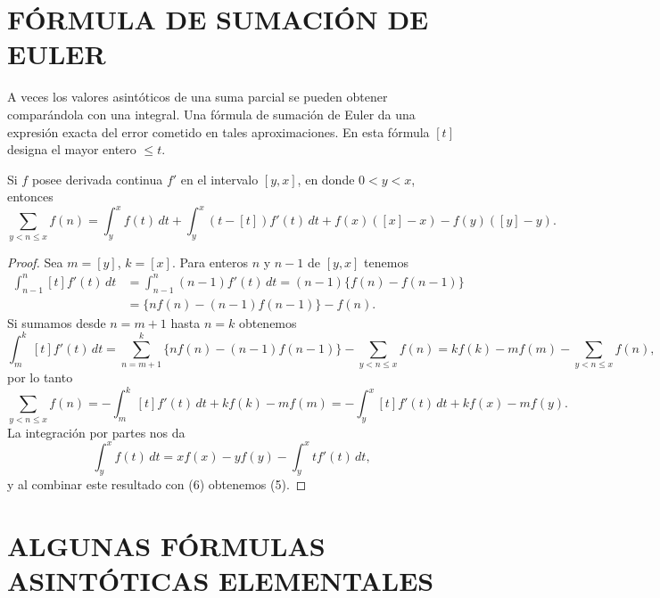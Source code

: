 \documentclass[12pt,a4paper]{book}
\begin{document}
    \section{FÓRMULA DE SUMACIÓN DE EULER}

    A veces los valores asintóticos de una suma parcial se pueden obtener comparándola con
    una integral. Una fórmula de sumación de Euler da una expresión exacta del error
    cometido en tales aproximaciones. En esta fórmula $[t]$ designa el mayor entero
    $\leq t$.

    \begin{teorema}
        Si $f$ posee derivada continua $f'$ en el intervalo $[y,x]$, en donde $0<y<x$,
        entonces
        \begin{equation}
            \sum_{y<n\leq x}f(n)=\int_y^x f(t)\,dt+\int_y^x(t-[t])f'(t)\,dt
            +f(x)([x]-x)-f(y)([y]-y).
        \end{equation}
    \end{teorema}

    \begin{proof}
        Sea $m=[y]$, $k=[x]$. Para enteros $n$ y $n-1$ de $[y,x]$ tenemos
        \begin{align*}
            \int_{n-1}^{n}[t]f'(t)\,dt&=\int_{n-1}^{n}(n-1)f'(t)\,dt=(n-1)\{f(n)-f(n-1)\}\\
            &=\{nf(n)-(n-1)f(n-1)\}-f(n).
        \end{align*}
        Si sumamos desde $n=m+1$ hasta $n=k$ obtenemos
        \begin{equation*}
            \int_{m}^{k}[t]f'(t)\,dt=\sum_{n=m+1}^{k}\{nf(n)-(n-1)f(n-1)\}-\sum_{y<n\leq x}f(n)
            =kf(k)-mf(m)-\sum_{y<n\leq x}f(n),
        \end{equation*}
        por lo tanto
        \begin{equation}
            \sum_{y<n\leq x}f(n)=-\int_{m}^{k}[t]f'(t)\,dt+kf(k)-mf(m)
            =-\int_{y}^{x}[t]f'(t)\,dt+kf(x)-mf(y).
        \end{equation}
        La integración por partes nos da
        \begin{equation*}
            \int_y^x f(t)\,dt=xf(x)-yf(y)-\int_y^x tf'(t)\,dt,
        \end{equation*}
        y al combinar este resultado con (6) obtenemos (5).
    \end{proof}

    \section{ALGUNAS FÓRMULAS ASINTÓTICAS ELEMENTALES}
\end{document}
